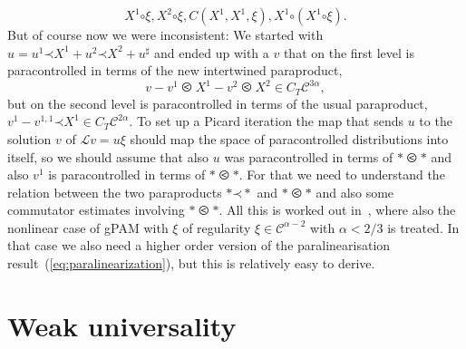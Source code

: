 \documentclass[a4paper, 11pt]{article}
\newcommand{\CC}{\mathcal{C}}
\newcommand{\para}{\mathord{\prec}}
\newcommand{\reso}{\mathord{\circ}}
\begin{document}
\[ X^{1} \reso \xi, X^{2} \reso \xi, C (X^{1}, X^{1},
   \xi), X^{1} \reso (X^{1} \reso \xi) . \]
But of course now we were inconsistent: We started with $u = u^{1} \para
X^{1} + u^{2} \para X^{2} + u^{\sharp}$ and ended up with a $v$
that on the first level is paracontrolled in terms of the new intertwined
paraproduct,
\[ v - v^{1} \olessthan X^{1} - v^{2} \olessthan X^{2} \in
   C_T \mathcal{C}^{3 \alpha}, \]
but on the second level is paracontrolled in terms of the usual paraproduct,
$v^{1} - v^{1, 1} \para X^{1} \in C_T \mathcal{C}^{2
\alpha}$. To set up a Picard iteration the map that sends $u$ to the solution
$v$ of $\mathcal{L}v = u \xi$ should map the space of paracontrolled
distributions into itself, so we should assume that also $u$ was
paracontrolled in terms of $\ast\olessthan\ast$ and also $v^{1}$ is
paracontrolled in terms of $\ast\olessthan\ast$. For that we need to understand the
relation between the two paraproducts $\ast \para \ast$ and $\ast \olessthan
\ast$ and also some commutator estimates involving $\ast\olessthan\ast$. All this is
worked out in~\cite{bailleul_higher_2016}, where also the nonlinear case of
gPAM with $\xi$ of regularity $\xi \in \CC^{\alpha-2}$ with $\alpha < 2/3$ is treated. In that case we also need a higher
order version of the paralinearisation result~(\ref{eq:paralinearization}), but this is relatively easy to derive.

\section{Weak universality}\label{sec:universality}
\end{document}

